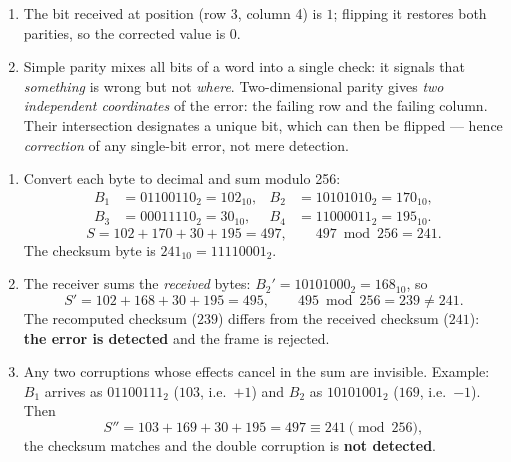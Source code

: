 \documentclass[11pt]{article}
\begin{document}
\begin{corrige}
\begin{enumerate}
\item The bit received at position (row 3, column 4) is $1$; flipping it restores both parities, so the corrected value is $\boxed{0}$.
\item Simple parity mixes all bits of a word into a single check: it signals that \emph{something} is wrong but not \emph{where}. Two-dimensional parity gives \emph{two independent coordinates} of the error: the failing row and the failing column. Their intersection designates a unique bit, which can then be flipped — hence \emph{correction} of any single-bit error, not mere detection.
\end{enumerate}
\end{corrige}

\begin{corrige}
\begin{enumerate}
\item Convert each byte to decimal and sum modulo 256:
\begin{align*}
B_1 &= 01100110_2 = 102_{10}, & B_2 &= 10101010_2 = 170_{10},\\
B_3 &= 00011110_2 = 30_{10},  & B_4 &= 11000011_2 = 195_{10}.
\end{align*}
\[ S = 102 + 170 + 30 + 195 = 497, \qquad 497 \bmod 256 = 241. \]
The checksum byte is $241_{10} = \boxed{11110001_2}$.
\item The receiver sums the \emph{received} bytes: $B_2' = 10101000_2 = 168_{10}$, so
\[ S' = 102 + 168 + 30 + 195 = 495, \qquad 495 \bmod 256 = 239 \neq 241. \]
The recomputed checksum ($239$) differs from the received checksum ($241$): \textbf{the error is detected} and the frame is rejected.
\item Any two corruptions whose effects cancel in the sum are invisible. Example: $B_1$ arrives as $01100111_2$ ($103$, i.e.\ $+1$) and $B_2$ as $10101001_2$ ($169$, i.e.\ $-1$). Then
\[ S'' = 103 + 169 + 30 + 195 = 497 \equiv 241 \pmod{256}, \]
the checksum matches and the double corruption is \textbf{not detected}.
\end{enumerate}
\end{corrige}
\end{document}
